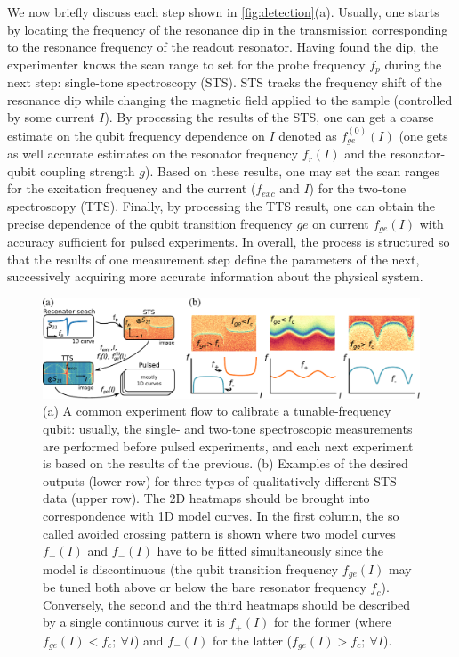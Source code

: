 \documentclass[%
 aip,
 draft,
 amsmath,amssymb,
 reprint,%
]{revtex4-1}
\begin{document}
We now briefly discuss each step shown in \autoref{fig:detection}(a). Usually, one starts by locating the frequency of the resonance dip in the transmission corresponding to the resonance frequency of the readout resonator. Having found the dip, the experimenter knows the scan range to set for the probe frequency $f_p$ during the next step: single-tone spectroscopy (STS). STS tracks the frequency shift of the resonance dip while changing the magnetic field applied to the sample (controlled by some current $I$). By processing the results of the STS, one can get a coarse estimate on the qubit frequency dependence on $I$  denoted as  $f^{(0)}_{ge}(I)$ (one gets as well accurate estimates on the resonator frequency $f_r(I)$ and the resonator-qubit coupling strength $g$). Based on these results, one may set the scan ranges for the excitation frequency and the current ($f_{exc}$ and $I$) for the two-tone spectroscopy (TTS). Finally, by processing the TTS result, one can obtain the precise dependence of the qubit transition frequency  $ge$ on current $f_{ge}(I)$	 with accuracy sufficient for pulsed experiments. In overall, the process is structured so that the results of one measurement step define the parameters of the next, successively acquiring more accurate information about the physical system.

\begin{figure}
	\centering
	\includegraphics[width=0.95\linewidth]{detection_sts}
	\caption{(a) A common experiment flow to calibrate a tunable-frequency qubit: usually, the single- and two-tone spectroscopic measurements are performed before pulsed experiments, and each next experiment is based on the results of the previous. (b) Examples of the desired outputs (lower row) for three types of qualitatively different STS data (upper row). The 2D heatmaps should be brought into correspondence with 1D model curves. In the first column, the so called avoided crossing pattern is shown where two model curves $f_+(I)$ and $f_-(I)$ have to be fitted simultaneously since the model is discontinuous (the qubit transition frequency $f_{ge}(I)$ may be tuned both above or below the bare resonator frequency $f_c$). Conversely, the second and the third heatmaps should be described by a single continuous curve: it is $f_+(I)$ for the former (where $f_{ge}(I)<f_c;\ \forall I$) and $f_-(I)$ for the latter ($f_{ge}(I)>f_c;\ \forall I$).}
	\label{fig:detection}	
\end{figure} 
\end{document}
